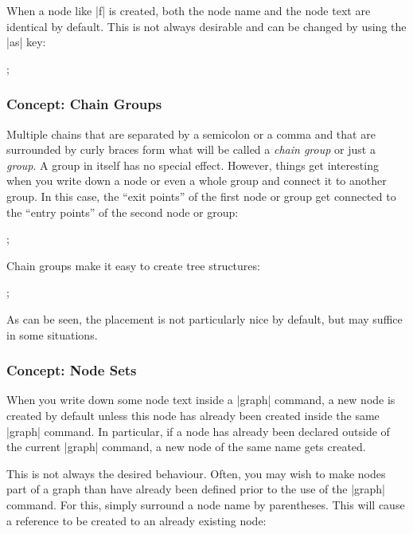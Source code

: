 When a node like |f| is created, both the node name and the node text
are identical by default. This is not always desirable and can be
changed by using the |as| key:

\begin{codeexample}[]
\tikz {};  
\end{codeexample}


\subsubsection{Concept: Chain Groups}

Multiple chains that are separated by a semicolon or a comma and that
are surrounded by curly braces form what will be called a \emph{chain
  group} or just a \emph{group}. A group in itself has no special
effect. However, things get interesting when you write down a node or
even a whole group and connect it to another group. In this case, the
``exit points'' of the first node or group get connected to the
``entry points'' of the second node or group:

\begin{codeexample}[]
\tikz {};  
\end{codeexample}

Chain groups make it easy to create tree structures:

\begin{codeexample}[]
\tikz {};
\end{codeexample}

As can be seen, the placement is not particularly nice by default, but
may suffice in some situations.


\subsubsection{Concept: Node Sets}

When you write down some node text inside a |graph| command, a new
node is created by default unless this node has already been created
inside the same |graph| command. In particular, if a node has
already been declared outside of the current |graph| command, a new
node of the same name gets created.

This is not always the desired behaviour. Often, you may wish to make
nodes part of a graph than have already been defined prior to the use
of the |graph| command. For this, simply surround a node name by
parentheses. This will cause a reference to be created to an already
existing node:


